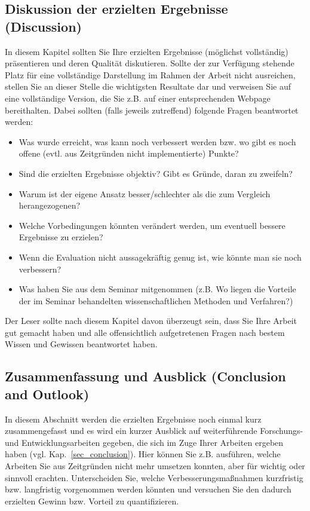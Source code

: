 \subsection{Diskussion der erzielten Ergebnisse (Discussion)}
In diesem Kapitel sollten Sie Ihre erzielten Ergebnisse (möglichst vollständig) präsentieren und deren Qualität diskutieren.
Sollte der zur Verfügung stehende Platz für eine vollständige Darstellung im Rahmen der Arbeit nicht ausreichen, stellen Sie an dieser Stelle die wichtigsten Resultate dar und verweisen Sie auf eine vollständige Version, die Sie z.B. auf einer entsprechenden Webpage bereithalten. 
Dabei sollten (falls jeweils zutreffend) folgende Fragen beantwortet werden:
\begin{itemize}
\item Was wurde erreicht, was kann noch verbessert werden bzw. wo gibt es noch offene (evtl. aus Zeitgründen nicht implementierte) Punkte?
\item Sind die erzielten Ergebnisse objektiv? Gibt es Gründe, daran zu zweifeln?
\item Warum ist der eigene Ansatz besser/schlechter als die zum Vergleich herangezogenen?
\item Welche Vorbedingungen könnten verändert werden, um eventuell bessere Ergebnisse zu erzielen?
\item Wenn die Evaluation nicht aussagekräftig genug ist, wie könnte man sie noch verbessern?
\item Was haben Sie aus dem Seminar mitgenommen (z.B. Wo liegen die Vorteile der im Seminar behandelten wissenschaftlichen Methoden und Verfahren?)
\end{itemize}
Der Leser sollte nach diesem Kapitel davon überzeugt sein, dass Sie Ihre Arbeit gut gemacht haben und alle offensichtlich aufgetretenen Fragen nach bestem Wissen und Gewissen beantwortet haben.

\subsection{Zusammenfassung und Ausblick (Conclusion and Outlook)}

In diesem Abschnitt werden die erzielten Ergebnisse noch einmal kurz zusammengefasst und es wird ein kurzer Ausblick auf weiterführende Forschungs- und Entwicklungsarbeiten gegeben, die sich im Zuge Ihrer Arbeiten ergeben haben (vgl. Kap.~\ref{sec_conclusion}). Hier können Sie z.B. ausführen, welche Arbeiten Sie aus Zeitgründen nicht mehr umsetzen konnten, aber für wichtig oder sinnvoll erachten. 
Unterscheiden Sie, welche Verbesserungsmaßnahmen kurzfristig bzw. langfristig vorgenommen werden könnten und versuchen Sie den dadurch erzielten Gewinn bzw. Vorteil zu quantifizieren.